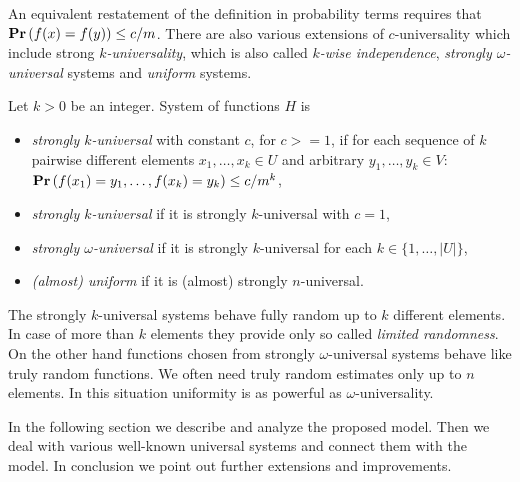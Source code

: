 An equivalent restatement of the definition in probability terms requires that $\mathbf{Pr}\left(f(x) = f(y)\right) \leq c/m$. There are also various extensions of $c$-universality which include strong \emph{$k$-universality}\cite{DBLP:conf/focs/WegmanC79}, which is also called \emph{$k$-wise independence}\cite{DBLP:conf/focs/WegmanC79}, \emph{strongly $\omega$-universal}\cite{DBLP:conf/focs/WegmanC79} systems and \emph{uniform}\cite{DBLP:journals/siamcomp/PaghP08} systems.
\begin{definition}
Let $k > 0$ be an integer. System of functions $H$ is
\begin{itemize}
	\item \emph{strongly $k$-universal} with constant $c$, for $c >= 1$, if for each sequence of $k$ pairwise different elements $x_1, \dots, x_k \in U$ and arbitrary $y_1, \dots, y_k \in V$: $\mathbf{Pr}\left(f(x_1) = y_1, \dots, f(x_k) = y_k\right) \leq {c}/{m^k}$,
	\item \emph{strongly $k$-universal} if it is strongly $k$-universal with $c = 1$,
	\item \emph{strongly $\omega$-universal} if it is strongly $k$-universal for each $k \in \{1, \dots, |U|\}$,
	\item \emph{(almost) uniform} if it is (almost) strongly $n$-universal.
\end{itemize}
\end{definition}

The strongly $k$-universal systems behave fully random up to $k$ different elements. 
In case of more than $k$ elements they provide only so called \emph{limited randomness}. 
On the other hand functions chosen from strongly $\omega$-universal systems behave like truly random functions. 
We often need truly random estimates only up to $n$ elements.
In this situation uniformity is as powerful as $\omega$-universality.

In the following section we describe and analyze the proposed model. 
Then we deal with various well-known universal systems and connect them with the model. 
In conclusion we point out further extensions and improvements.
